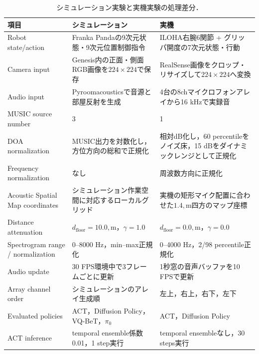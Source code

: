 \documentclass{article}
\begin{document}
\begin{table}[t]
\centering
\scriptsize
\setlength{\tabcolsep}{3pt}
\caption{シミュレーション実験と実機実験の処理差分．}
\label{tab:sim_real_diff}
\begin{tabular}{p{} p{} p{}}
\hline
項目 & シミュレーション & 実機 \\
\hline
Robot state/action & Franka Pandaの9次元状態・9次元位置制御指令 & ILOHA右腕6関節 + グリッパ開度の7次元状態・行動 \\
Camera input & Genesis内の正面・側面RGB画像を$224\times224$で保存 & RealSense画像をクロップ・リサイズして$224\times224$へ変換 \\
Audio input & Pyroomacousticsで音源と部屋反射を生成 & 4台の8chマイクロフォンアレイから16 kHzで実録音 \\
MUSIC source number & 3 & 1 \\
DOA normalization & MUSIC出力を対数化し，方位方向の総和で正規化 & 相対dB化し，60 percentileをノイズ床，15 dBをダイナミックレンジとして正規化 \\
Frequency normalization & なし & 周波数方向に正規化 \\
Acoustic Spatial Map coordinates & シミュレーション作業空間に対応するローカルグリッド & 実機の矩形マイク配置に合わせた$1.4,\mathrm{m}$四方のマップ座標 \\
Distance attenuation & $d_{\mathrm{floor}}=10.0,\mathrm{m}$，$\gamma=1.0$ & $d_{\mathrm{floor}}=0.0,\mathrm{m}$，$\gamma=0.0$ \\
Spectrogram range / normalization & 0--8000 Hz，min--max正規化 & 0--4000 Hz，2/98 percentile正規化 \\
Audio update & 30 FPS環境中で3フレームごとに更新 & 1秒窓の音声バッファを10 FPSで更新 \\
Array channel order & シミュレーションのアレイ生成順 & 左上，右上，右下，左下 \\
Evaluated policies & ACT，Diffusion Policy，VQ-BeT，$\pi_0$ & ACT，Diffusion Policy \\
ACT inference & temporal ensemble係数0.01，1 step実行 & temporal ensembleなし，30 steps実行 \\
\hline
\end{tabular}
\end{table}











\end{document}
